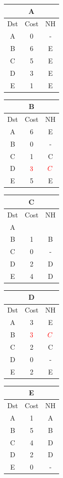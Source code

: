 \documentclass[10pt]{article}
\begin{document}
			\begin{table}[h!]
				\begin{tabular}{|c||c||c|}
					\hline
					\multicolumn{3}{|c|}{A} \\
					\hline
					Dst & Cost & NH \\
					\hline
					A & 0 & - \\
					B & 6 & E \\
					C & 5 & E \\
					D & 3 & E \\
					E & 1 & E \\
					\hline
				\end{tabular}
				\begin{tabular}{|c||c||c|}
					\hline
					\multicolumn{3}{|c|}{B} \\
					\hline
					Dst & Cost & NH \\
					\hline
					A & 6 & E \\
					B & 0 & - \\
					C & 1 & C \\
					D & $\color{red} 3$  & $\color{red} C$ \\
					E & 5 & E \\
					\hline
				\end{tabular}
				\begin{tabular}{|c||c||c|}
					\hline
					\multicolumn{3}{|c|}{C} \\
					\hline
					Dst & Cost & NH \\
					\hline
					A &   &   \\
					B & 1 & B \\
					C & 0 & - \\
					D & 2 & D \\
					E & 4 & D \\
					\hline
				\end{tabular}
				\begin{tabular}{|c||c||c|}
					\hline
					\multicolumn{3}{|c|}{D} \\
					\hline
					Dst & Cost & NH \\
					\hline
					A & 3 & E \\
					B & $\color{red} 3$  & $\color{red} C$ \\
					C & 2 & C \\
					D & 0 & - \\
					E & 2 & E \\
					\hline
				\end{tabular}
				\begin{tabular}{|c||c||c|}
					\hline
					\multicolumn{3}{|c|}{E} \\
					\hline
					Dst & Cost & NH \\
					\hline
					A & 1 & A \\
					B & 5 & B \\
					C & 4 & D \\
					D & 2 & D \\
					E & 0 & - \\
					\hline
				\end{tabular}
			\end{table}
\end{document}
